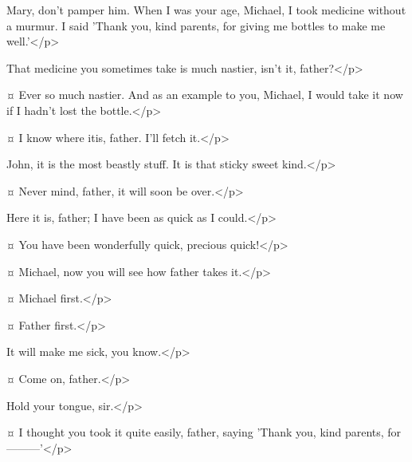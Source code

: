 \begin{drama}
\mrdarlingspeaks
Mary, don't pamper him.
When I was your age, Michael, I took medicine without a murmur.
I said 'Thank you, kind parents, for giving me bottles to make me well.'</p>


\wendyspeaks
That medicine you sometimes take is much nastier, isn't it, father?</p>

\mrdarlingspeaks {}¤
Ever so much nastier.
And as an example to you, Michael, I would take it now
if I hadn't lost the bottle.</p>

\wendyspeaks {}¤
I know where itis, father.
I'll fetch it.</p>


\mrdarlingspeaks
John, it is the most beastly stuff.
It is that sticky sweet kind.</p>

\johnspeaks {}¤
Never mind, father, it will soon be over.</p>


\wendyspeaks
Here it is, father; I have been as quick as I could.</p>

\mrdarlingspeaks {}¤
You have been wonderfully quick, precious quick!</p>


\wendyspeaks {}¤
Michael, now you will see how father takes it.</p>

\mrdarlingspeaks {}¤
Michael first.</p>

\michaelspeaks {}¤
Father first.</p>

\mrdarlingspeaks
It will make me sick, you know.</p>

\johnspeaks {}¤
Come on, father.</p>

\mrdarlingspeaks
Hold your tongue, sir.</p>

\wendyspeaks {}¤
I thought you took it quite easily, father, saying 'Thank you, kind parents, for———'</p>


\end{drama}
